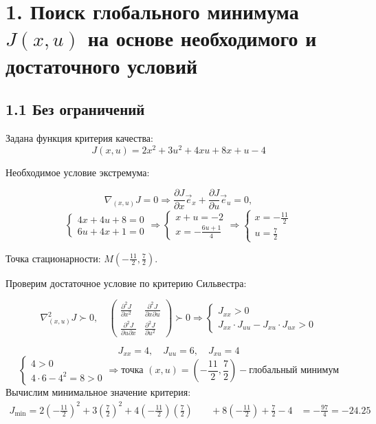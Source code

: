 \section*{1. Поиск глобального минимума \(J(x,u)\) на основе необходимого и достаточного условий}

\subsection*{1.1 Без ограничений}
Задана функция критерия качества:
\[
J(x,u) = 2x^2 + 3u^2 + 4xu + 8x + u - 4
\]

Необходимое условие экстремума:

\[
\nabla_{(x,u)}J = 0 \Rightarrow \frac{\partial J}{\partial x}\vec{e}_x + \frac{\partial J}{\partial u}\vec{e}_u = 0,
\]
\[
\begin{cases}
4x + 4u + 8 = 0 \\
6u + 4x + 1 = 0
\end{cases}
\Rightarrow
\begin{cases}
x + u = -2 \\
x = -\frac{6u + 1}{4}
\end{cases}
\Rightarrow
\begin{cases}
x = -\frac{11}{2} \\[1ex]
u = \frac{7}{2}
\end{cases}
\]

Точка стационарности: \(M(-\frac{11}{2}, \frac{7}{2})\).

Проверим достаточное условие по критерию Сильвестра:

\[
\nabla^2_{(x,u)} J \succ 0, \quad
\begin{pmatrix}
\frac{\partial^2 J}{\partial x^2} & \frac{\partial^2 J}{\partial x \partial u} \\[2ex]
\frac{\partial^2 J}{\partial u \partial x} & \frac{\partial^2 J}{\partial u^2}
\end{pmatrix}
\succ 0 \Rightarrow
\begin{cases}
J_{xx} > 0 \\
J_{xx} \cdot J_{uu} - J_{xu} \cdot J_{ux} > 0
\end{cases}
\]

\[
J_{xx} = 4, \quad J_{uu} = 6, \quad J_{xu} = 4
\]
\[
\begin{cases}
4 > 0 \\
4 \cdot 6 - 4^2 = 8 > 0
\end{cases}
\Rightarrow \text{точка } (x, u) = \left(-\frac{11}{2}, \frac{7}{2}\right) - \text{глобальный минимум}
\]
Вычислим минимальное значение критерия:
\[
\begin{aligned}
J_{\min}=2\left(-\frac{11}{2}\right)^2
+3\left(\frac{7}{2}\right)^2
+4\left(-\frac{11}{2}\right)\left(\frac{7}{2}\right)
&\quad+8\left(-\frac{11}{2}\right)+\frac{7}{2}-4
&=-\frac{97}{4}=-24.25
\end{aligned}
\]

